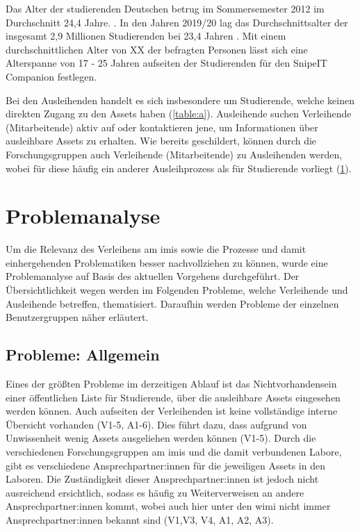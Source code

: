 Das Alter der studierenden Deutschen betrug im Sommersemester 2012 im
Durchschnitt 24,4 Jahre. \cite{middendorff2017wirtschaftliche}. In den Jahren
2019/20 lag das Durchschnittsalter der insgesamt 2,9 Millionen Studierenden bei
23,4 Jahren \cite{noauthor_studierende_nodate}. Mit einem durchschnittlichen
Alter von XX der befragten Personen lässt sich eine Alterspanne von 17 - 25
Jahren aufseiten der Studierenden für den SnipeIT Companion festlegen.

Bei den Ausleihenden handelt es sich insbesondere um Studierende, welche keinen
direkten Zugang zu den Assets haben (\ref{table:a}). Ausleihende suchen
Verleihende (Mitarbeitende) aktiv auf oder kontaktieren jene, um Informationen
über ausleihbare Assets zu erhalten. Wie bereits geschildert, können durch die
Forschungsgruppen auch Verleihende (Mitarbeitende) zu Ausleihenden werden, wobei
für diese häufig ein anderer Ausleihprozess als für Studierende vorliegt
(\ref{section:iststand}).


\section{Problemanalyse}
\label{section:iststand}

Um die Relevanz des Verleihens am \ac{imis} sowie die Prozesse und damit
einhergehenden Problematiken besser nachvollziehen zu können, wurde eine
Problemanalyse auf Basis des aktuellen Vorgehens durchgeführt. Der
Übersichtlichkeit wegen werden im Folgenden Probleme, welche Verleihende und
Ausleihende betreffen, thematisiert. Daraufhin werden Probleme der einzelnen
Benutzergruppen näher erläutert.

\subsection{Probleme: Allgemein}
\label{section:probleme-allgemein}
Eines der größten Probleme im derzeitigen Ablauf ist das Nichtvorhandensein
einer öffentlichen Liste für Studierende, über die ausleihbare Assets eingesehen
werden können. Auch aufseiten der Verleihenden ist keine vollständige interne
Übersicht vorhanden (V1-5, A1-6). Dies führt dazu, dass aufgrund von
Unwissenheit wenig Assets ausgeliehen werden können (V1-5). Durch die
verschiedenen Forschungsgruppen am \ac{imis} und die damit verbundenen Labore,
gibt es verschiedene Ansprechpartner:innen für die jeweiligen Assets in den
Laboren. Die Zuständigkeit dieser Ansprechpartner:innen ist jedoch nicht
ausreichend ersichtlich, sodass es häufig zu Weiterverweisen an andere
Ansprechpartner:innen kommt, wobei auch hier unter den \ac{wimi} nicht immer
Ansprechpartner:innen bekannt sind (V1,V3, V4, A1, A2, A3).


